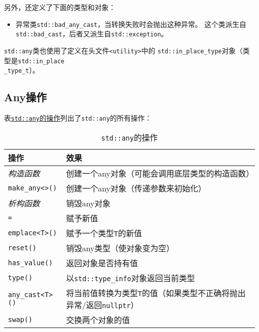 另外，还定义了下面的类型和对象：
\begin{itemize}
    \item 异常类\texttt{std::bad\_any\_cast}，当转换失败时会抛出这种异常。
    这个类派生自\texttt{std::bad\_cast}，后者又派生自\texttt{std::exception}。
\end{itemize}
\texttt{std::any}类也使用了定义在头文件\texttt{<utility>}中的
\texttt{std::in\_place\_type}对象（类型是\texttt{std::in\_place\\
\_type\_t}）。

\subsection{Any操作}
表\hyperref[t17.1]{\texttt{std::any}的操作}列出了\texttt{std::any}的所有操作：
\begin{table}[htb]
    \centering
    \begin{tabular}{l|l}
        \hline
        \textbf{操作}             & \textbf{效果}                                            \\
        \hline
        \emph{构造函数}             & 创建一个any对象（可能会调用底层类型的构造函数）                              \\
        \texttt{make\_any<>()}  & 创建一个any对象（传递参数来初始化）                                    \\
        \emph{析构函数}             & 销毁any对象                                                \\
        \texttt{=}              & 赋予新值                                                   \\
        \texttt{emplace<T>()}   & 赋予一个类型\texttt{T}的新值                                    \\
        \texttt{reset()}        & 销毁any类型（使对象变为空）                                        \\
        \texttt{has\_value()}   & 返回对象是否持有值                                              \\
        \texttt{type()}         & 以\texttt{std::type\_info}对象返回当前类型                      \\
        \texttt{any\_cast<T>()} & 将当前值转换为类型\texttt{T}的值（如果类型不正确将抛出异常/返回\texttt{nullptr}） \\
        \texttt{swap()}         & 交换两个对象的值                                               \\
        \hline
    \end{tabular}
    \caption{\texttt{std::any}的操作}
    \label{t17.1}
\end{table}

